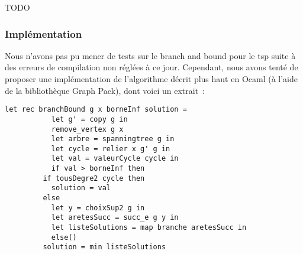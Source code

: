 TODO

\subsubsection{Implémentation}

Nous n'avons pas pu mener de tests sur le branch and bound pour le tsp
suite à des erreurs de compilation non réglées à ce jour. Cependant,
nous avons tenté de proposer une implémentation de l'algorithme décrit plus haut
en Ocaml (à l'aide de la bibliothèque Graph Pack), dont voici un extrait~:
\begin{lstlisting}
let rec branchBound g x borneInf solution = 
	       let g' = copy g in
	       remove_vertex g x
	       let arbre = spanningtree g in
	       let cycle = relier x g' g in 
	       let val = valeurCycle cycle in
	       if val > borneInf then 
		 if tousDegre2 cycle then
		   solution = val
		 else
		   let y = choixSup2 g in
		   let aretesSucc = succ_e g y in 
		   let listeSolutions = map branche aretesSucc in
	       else()
		 solution = min listeSolutions
\end{lstlisting}

